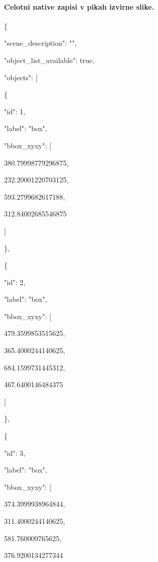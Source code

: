\documentclass[10pt,a4paper]{article}
\begin{document}
\paragraph{Celotni native zapisi v pikah izvirne slike.}
\{\par
  "scene\_description":\allowbreak{} "",\allowbreak{}\par
  "object\_list\_available":\allowbreak{} true,\allowbreak{}\par
  "objects":\allowbreak{} [\par
    \{\par
      "id":\allowbreak{} 1,\allowbreak{}\par
      "label":\allowbreak{} "box",\allowbreak{}\par
      "bbox\_xyxy":\allowbreak{} [\par
        380.79998779296875,\allowbreak{}\par
        232.20001220703125,\allowbreak{}\par
        593.2799682617188,\allowbreak{}\par
        312.84002685546875\par
      ]\par
    \},\allowbreak{}\par
    \{\par
      "id":\allowbreak{} 2,\allowbreak{}\par
      "label":\allowbreak{} "box",\allowbreak{}\par
      "bbox\_xyxy":\allowbreak{} [\par
        479.3599853515625,\allowbreak{}\par
        365.4000244140625,\allowbreak{}\par
        684.1599731445312,\allowbreak{}\par
        467.6400146484375\par
      ]\par
    \},\allowbreak{}\par
    \{\par
      "id":\allowbreak{} 3,\allowbreak{}\par
      "label":\allowbreak{} "box",\allowbreak{}\par
      "bbox\_xyxy":\allowbreak{} [\par
        374.3999938964844,\allowbreak{}\par
        311.4000244140625,\allowbreak{}\par
        581.760009765625,\allowbreak{}\par
        376.9200134277344\par
\end{document}

